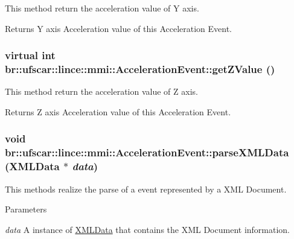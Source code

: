 This method return the acceleration value of Y axis. 

\begin{DoxyReturn}{Returns}
Y axis Acceleration value of this Acceleration Event. 
\end{DoxyReturn}
\hypertarget{classbr_1_1ufscar_1_1lince_1_1mmi_1_1AccelerationEvent_a311a142a28339e32a09ba84971617351}{
\subsubsection[{getZValue}]{\setlength{\rightskip}{0pt plus 5cm}virtual int br::ufscar::lince::mmi::AccelerationEvent::getZValue ()}}
\label{classbr_1_1ufscar_1_1lince_1_1mmi_1_1AccelerationEvent_a311a142a28339e32a09ba84971617351}


This method return the acceleration value of Z axis. 

\begin{DoxyReturn}{Returns}
Z axis Acceleration value of this Acceleration Event. 
\end{DoxyReturn}
\hypertarget{classbr_1_1ufscar_1_1lince_1_1mmi_1_1AccelerationEvent_a5ad5b14f13e40450e619ce08e4ba9937}{
\subsubsection[{parseXMLData}]{\setlength{\rightskip}{0pt plus 5cm}void br::ufscar::lince::mmi::AccelerationEvent::parseXMLData ({\bf XMLData} $\ast$ {\em data})}}
\label{classbr_1_1ufscar_1_1lince_1_1mmi_1_1AccelerationEvent_a5ad5b14f13e40450e619ce08e4ba9937}


This methods realize the parse of a event represented by a XML Document. 


\begin{DoxyParams}{Parameters}
\item[{\em data}]A instance of \hyperlink{structbr_1_1ufscar_1_1lince_1_1mmi_1_1XMLData}{XMLData} that contains the XML Document information. \end{DoxyParams}


